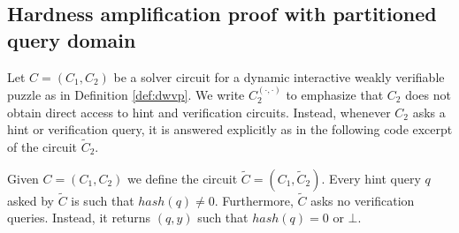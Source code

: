 %
\subsection{Hardness amplification proof with partitioned query domain}
\label{st:amplification_proof}
Let $C = (C_1, C_2)$ be a solver circuit for a dynamic interactive weakly verifiable puzzle as in Definition \ref{def:dwvp}.
We write $C_2^{(\cdot, \cdot)}$ to emphasize that $C_2$ does not obtain direct access to hint and verification circuits.
Instead, whenever $C_2$ asks a hint or verification query, it is answered explicitly
as in the following code excerpt of the circuit $\widetilde{C}_2$.

Given $C = (C_1, C_2)$ we define the circuit $\widetilde{C} = (C_1, \widetilde{C}_2)$.
Every hint query $q$ asked by $\widetilde{C}$ is such that $hash(q) \neq 0$.
Furthermore, $\widetilde{C}$ asks no verification queries. Instead, it returns $(q,y)$ such that
$hash(q) = 0$ or $\bot$.

